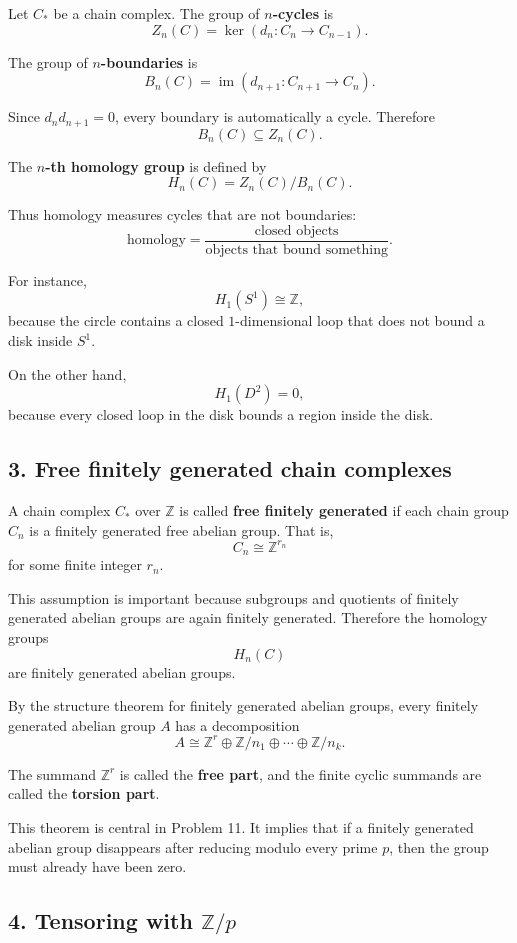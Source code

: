\documentclass[12pt,a4paper]{article}
\theoremstyle{notespace}
\begin{document}
Let \(C_*\) be a chain complex. The group of \textbf{\(n\)-cycles} is
\[
Z_n(C)=\ker(d_n:C_n\to C_{n-1}).
\]

The group of \textbf{\(n\)-boundaries} is
\[
B_n(C)=\operatorname{im}(d_{n+1}:C_{n+1}\to C_n).
\]

Since \(d_n d_{n+1}=0\), every boundary is automatically a cycle. Therefore
\[
B_n(C)\subseteq Z_n(C).
\]

The \textbf{\(n\)-th homology group} is defined by
\[
H_n(C)=Z_n(C)/B_n(C).
\]

Thus homology measures cycles that are not boundaries:
\[
\text{homology}
=
\frac{\text{closed objects}}{\text{objects that bound something}}.
\]

For instance,
\[
H_1(S^1)\cong \mathbb Z,
\]
because the circle contains a closed \(1\)-dimensional loop that does not bound a disk inside \(S^1\).

On the other hand,
\[
H_1(D^2)=0,
\]
because every closed loop in the disk bounds a region inside the disk.

\subsection*{3. Free finitely generated chain complexes}

A chain complex \(C_*\) over \(\mathbb Z\) is called \textbf{free finitely generated} if each chain group \(C_n\) is a finitely generated free abelian group. That is,
\[
C_n\cong \mathbb Z^{r_n}
\]
for some finite integer \(r_n\).

This assumption is important because subgroups and quotients of finitely generated abelian groups are again finitely generated. Therefore the homology groups
\[
H_n(C)
\]
are finitely generated abelian groups.

By the structure theorem for finitely generated abelian groups, every finitely generated abelian group \(A\) has a decomposition
\[
A\cong \mathbb Z^r\oplus
\mathbb Z/n_1\oplus\cdots\oplus \mathbb Z/n_k.
\]

The summand \(\mathbb Z^r\) is called the \textbf{free part}, and the finite cyclic summands are called the \textbf{torsion part}.

This theorem is central in Problem 11. It implies that if a finitely generated abelian group disappears after reducing modulo every prime \(p\), then the group must already have been zero.

\subsection*{4. Tensoring with \(\mathbb Z/p\)}
\end{document}
